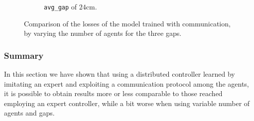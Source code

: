 \begin{figure}[!htb]
\begin{center}
\begin{subfigure}[h]{0.32\textwidth}
			\caption{\texttt{avg\_gap} of $24$\gls{cm}.}
		\end{subfigure}
	\end{center}
	\vspace{-0.5cm}
	\caption[Losses summary of the second set of experiments 
	(communication).]{Comparison of the losses of the model trained with 
		communication, by varying the number of agents for the three gaps.}
	\label{fig:commlossexte81324}
\end{figure}


\subsubsection{Summary}
\label{subsubsec:commsummary}
In this section we have shown that using a distributed controller learned by 
imitating an expert and exploiting a communication protocol among the 
agents, it is possible to obtain results more or less comparable to those reached 
employing an expert controller, while a bit worse when using variable number of 
agents and gaps.
